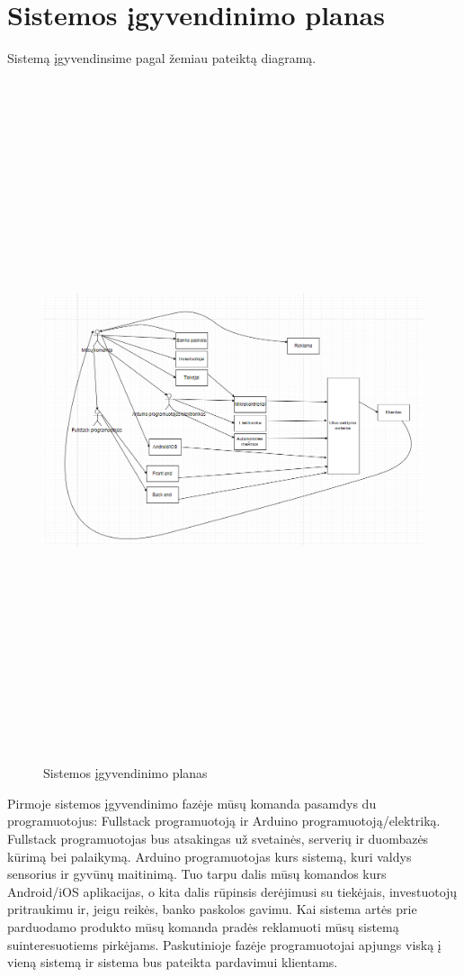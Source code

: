 \documentclass[oneside]{VUMIFPSkursinis}
\begin{document}
\section{Sistemos įgyvendinimo planas}
Sistemą įgyvendinsime pagal žemiau pateiktą diagramą. 
\begin{figure}[H]
		\centering	
	\includegraphics[width=18cm,height=20cm,keepaspectratio]{SistemosIgyvendinimas.png}
	\caption{Sistemos įgyvendinimo planas}
	\label{fig:Sistemos įgyvendinimo planas}
\end{figure}
Pirmoje sistemos įgyvendinimo fazėje mūsų komanda pasamdys du programuotojus: Fullstack programuotoją ir Arduino programuotoją/elektriką. Fullstack programuotojas bus atsakingas už svetainės, serverių ir duombazės kūrimą bei palaikymą. Arduino programuotojas kurs sistemą, kuri valdys sensorius ir gyvūnų maitinimą. Tuo tarpu dalis mūsų komandos kurs Android/iOS aplikacijas, o kita dalis rūpinsis derėjimusi su tiekėjais, investuotojų pritraukimu ir, jeigu reikės, banko paskolos gavimu. Kai sistema artės prie parduodamo produkto mūsų komanda pradės reklamuoti mūsų sistemą suinteresuotiems pirkėjams. Paskutinioje fazėje programuotojai apjungs viską į vieną sistemą ir sistema bus pateikta pardavimui klientams. 
\end{document}
